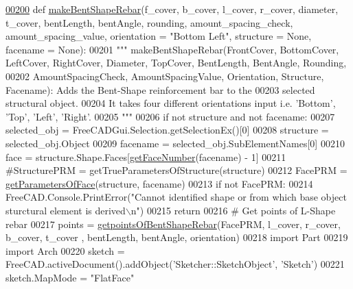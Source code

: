 \begin{DoxyCode}
\hypertarget{namespaceBentShapeRebar.tex_l00200}{}\hyperlink{namespaceBentShapeRebar_aac46779d3e1905db5a3788917f6e2476}{00200} \textcolor{keyword}{def }\hyperlink{namespaceBentShapeRebar_aac46779d3e1905db5a3788917f6e2476}{makeBentShapeRebar}(f\_cover, b\_cover, l\_cover, r\_cover, diameter, t\_cover, bentLength,
       bentAngle, rounding, amount\_spacing\_check, amount\_spacing\_value, orientation = "Bottom Left", structure = 
      None, facename = None):
00201     \textcolor{stringliteral}{""" makeBentShapeRebar(FrontCover, BottomCover, LeftCover, RightCover, Diameter, TopCover, BentLength,
       BentAngle, Rounding,}
00202 \textcolor{stringliteral}{    AmountSpacingCheck, AmountSpacingValue, Orientation, Structure, Facename): Adds the Bent-Shape
       reinforcement bar to the}
00203 \textcolor{stringliteral}{    selected structural object.}
00204 \textcolor{stringliteral}{    It takes four different orientations input i.e. 'Bottom', 'Top', 'Left', 'Right'.}
00205 \textcolor{stringliteral}{    """}
00206     \textcolor{keywordflow}{if} \textcolor{keywordflow}{not} structure \textcolor{keywordflow}{and} \textcolor{keywordflow}{not} facename:
00207         selected\_obj = FreeCADGui.Selection.getSelectionEx()[0]
00208         structure = selected\_obj.Object
00209         facename = selected\_obj.SubElementNames[0]
00210     face = structure.Shape.Faces[\hyperlink{namespaceRebarfunc_a3885b3b63e3a41508ac79bc7550cf301}{getFaceNumber}(facename) - 1]
00211     \textcolor{comment}{#StructurePRM = getTrueParametersOfStructure(structure)}
00212     FacePRM = \hyperlink{namespaceRebarfunc_a92122b3d7cedd3d47bb63380a5ac4d08}{getParametersOfFace}(structure, facename)
00213     \textcolor{keywordflow}{if} \textcolor{keywordflow}{not} FacePRM:
00214         FreeCAD.Console.PrintError(\textcolor{stringliteral}{"Cannot identified shape or from which base object sturctural element is
       derived\(\backslash\)n"})
00215         \textcolor{keywordflow}{return}
00216     \textcolor{comment}{# Get points of L-Shape rebar}
00217     points = \hyperlink{namespaceBentShapeRebar_a33951a8ab21a73bae42af9f81d7c43c3}{getpointsOfBentShapeRebar}(FacePRM, l\_cover, r\_cover, b\_cover, t\_cover
      , bentLength, bentAngle, orientation)
00218     \textcolor{keyword}{import} Part
00219     \textcolor{keyword}{import} Arch
00220     sketch = FreeCAD.activeDocument().addObject(\textcolor{stringliteral}{'Sketcher::SketchObject'}, \textcolor{stringliteral}{'Sketch'})
00221     sketch.MapMode = \textcolor{stringliteral}{"FlatFace"}

\end{DoxyCode}
